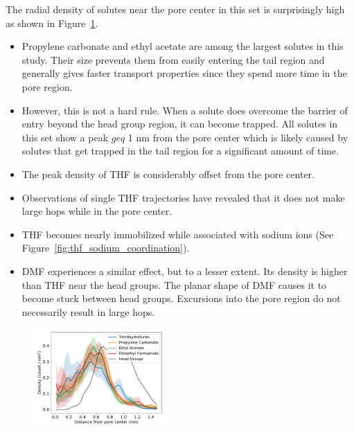 \documentclass{article}
\begin{document}
  The radial density of solutes near the pore center in this set is surprisingly high
  as shown in Figure~\ref{fig:nondonors_rdf}.
  \begin{itemize}
    \item Propylene carbonate and ethyl acetate are among the largest solutes
    in this study. Their size prevents them from easily entering the tail 
    region and generally gives faster transport properties since they spend
    more time in the pore region. 
    \item However, this is not a hard rule. When a solute does overcome the 
    barrier of entry beyond the head group region, it can become trapped. All
    solutes in this set show a peak $geq$ 1 nm from the pore center which is
    likely caused by solutes that get trapped in the tail region for a significant
    amount of time.
	\item The peak density of THF is considerably offset from the pore center.
	\item Observations of single THF trajectories have revealed that it does not make
	large hops while in the pore center.
	\item THF becomes nearly immobilized while associated with sodium ions (See 
	Figure~\ref{fig:thf_sodium_coordination}).
	\item DMF experiences a similar effect, but to a lesser extent. Its density is 
	higher than THF near the head groups. The planar shape of DMF causes it to 
	become stuck between head groups. Excursions into the pore region do not
	necessarily result in large hops.
  \end{itemize}
 
  \begin{figure}
  \centering
  \includegraphics[width=0.45\textwidth]{nondonors_rdf.pdf}
  \caption{}\label{fig:nondonors_rdf}
  \end{figure}
  
\end{document}
